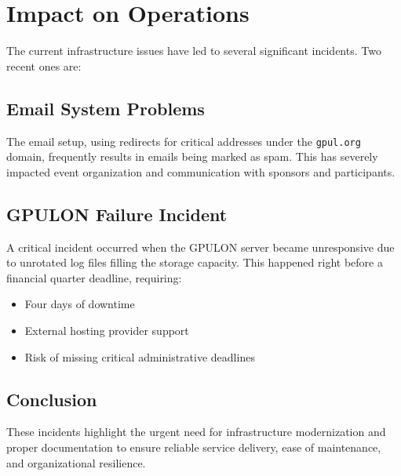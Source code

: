 \section{Impact on Operations}

The current infrastructure issues have led to several significant incidents. Two recent ones are:

\subsection{Email System Problems}

The email setup, using redirects for critical addresses under the \texttt{gpul.org} domain, frequently results in emails being marked as spam. This has severely impacted event organization and communication with sponsors and participants.

\subsection{GPULON Failure Incident}

A critical incident occurred when the GPULON server became unresponsive due to unrotated log files filling the storage capacity. This happened right before a financial quarter deadline, requiring:
\begin{itemize}
  \item Four days of downtime
  \item External hosting provider support
  \item Risk of missing critical administrative deadlines
\end{itemize}

\subsection{Conclusion}

These incidents highlight the urgent need for infrastructure modernization and proper documentation to ensure reliable service delivery, ease of maintenance, and organizational resilience.
